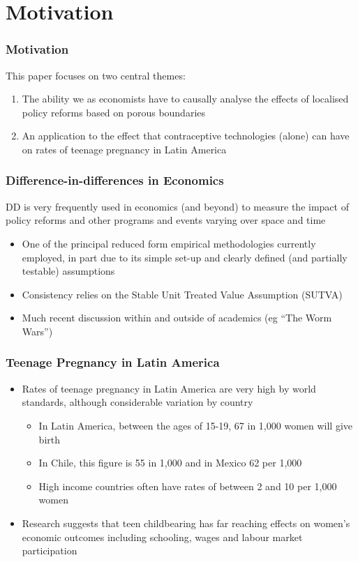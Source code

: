 \documentclass[10pt,letterpaper,subeqn]{beamer}
\begin{document}
\section{Motivation}
\begin{frame}[label=motivation]
  \frametitle{Motivation}
This paper focuses on two central themes:
\vspace{7mm}
\begin{enumerate}
\item The ability we as economists have to causally analyse the effects of 
localised policy reforms based on porous boundaries \\
\vspace{3mm}
\item An application to the effect that contraceptive technologies (alone) can
have on rates of teenage pregnancy in Latin America
\end{enumerate}
\end{frame}

\begin{frame}[label=DDM]
  \frametitle{Difference-in-differences in Economics}
DD is very frequently used in economics (and beyond) 
to measure the impact of policy reforms and other programs and events varying over 
space and time
\vspace{5mm}
\begin{itemize}
 \item One of the principal reduced form empirical methodologies currently 
employed, in part due to its simple set-up and clearly defined (and partially 
testable) assumptions
 \item Consistency relies on the Stable Unit Treated Value Assumption (SUTVA)
 \item Much recent discussion within and outside of academics (eg ``The Worm Wars'')
\end{itemize}
\end{frame}

\begin{frame}[label=teenPreg]
  \frametitle{Teenage Pregnancy in Latin America}
\vspace{4mm}
\begin{itemize}
\item Rates of teenage pregnancy in Latin America are very high by world standards, 
although considerable variation by country
\begin{itemize}
\item In Latin America, between the ages of 15-19, 67 in 1,000 women will give birth
\item In Chile, this figure is 55 in 1,000 and in Mexico 62 per 1,000
\item High income countries often have rates of between 2 and 10 per 1,000 women
\end{itemize}
\vspace{3mm}
\item Research suggests that teen childbearing has far reaching effects on women's
economic outcomes including schooling, wages and labour market participation
\end{itemize}
\end{frame}
\end{document}
